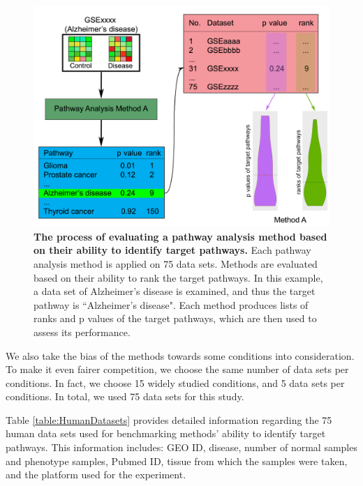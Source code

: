 \begin{figure}
\includegraphics[width=0.8\linewidth]{../Figures/Fig1}
\caption{\textbf{The process of evaluating a pathway analysis method based on their ability to identify target pathways.} Each pathway analysis method is applied on 75 data sets. Methods are evaluated based on their ability to rank the target pathways. In this example, a data set of Alzheimer's disease is examined, and thus the target pathway is ``Alzheimer's disease". Each method produces lists of ranks and p values of the target pathways, which are then used to assess its performance.}
\label{workflow}
\end{figure}

We also take the bias of the methods towards some conditions into consideration. To make it even fairer competition, we choose the same number of data sets per conditions. In fact, we choose 15 widely studied conditions, and 5 data sets per conditions. In total, we used 75 data sets for this study.

Table \ref{table:HumanDatasets} provides detailed information regarding the 75 human data sets used for benchmarking methods' ability to identify target pathways. This information includes: GEO ID, disease, number of normal samples and phenotype samples,  Pubmed ID, tissue from which the samples were taken, and the platform used for the experiment.

